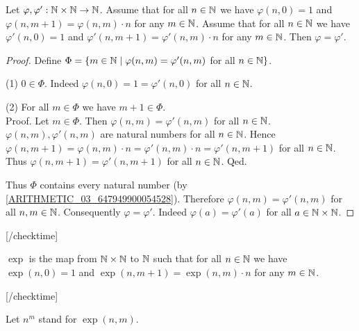 \documentclass[10pt]{article}
\begin{document}
  \begin{forthel}
    [checktime 3]
    \begin{lemma}
      Let $\varphi, \varphi' : \mathbb{N} \times \mathbb{N} \to \mathbb{N}$.
      Assume that for all $n \in \mathbb{N}$ we have $\varphi(n, 0) = 1$ and
      $\varphi(n, m + 1) = \varphi(n,m) \cdot n$ for any $m \in \mathbb{N}$.
      Assume that for all $n \in \mathbb{N}$ we have $\varphi'(n, 0) = 1$ and
      $\varphi'(n, m + 1) = \varphi'(n,m) \cdot n$ for any $m \in \mathbb{N}$.
      Then $\varphi = \varphi'$.
    \end{lemma}
    \begin{proof}
      Define $\Phi = \{ m \in \mathbb{N} \mid \varphi(n,m) = \varphi'(n,m)$ for
      all $n \in \mathbb{N} \}$.

      (1) $0 \in \Phi$.
      Indeed $\varphi(n,0) = 1 = \varphi'(n,0)$ for all $n \in \mathbb{N}$.

      (2) For all $m \in \Phi$ we have $m + 1 \in \Phi$. \\
      Proof.
        Let $m \in \Phi$.
        Then $\varphi(n,m) = \varphi'(n,m)$ for all $n \in \mathbb{N}$.
        $\varphi(n,m), \varphi'(n,m)$ are natural numbers for all $n \in \mathbb{N}$. %
        Hence $\varphi(n, m + 1)
          = \varphi(n,m) \cdot n
          = \varphi'(n,m) \cdot n
          = \varphi'(n, m + 1)$
        for all $n \in \mathbb{N}$.
        Thus $\varphi(n,m + 1) = \varphi'(n,m + 1)$ for all $n \in \mathbb{N}$.
      Qed.

      Thus $\Phi$ contains every natural number (by \cref{ARITHMETIC_03_647949900054528}).
      Therefore $\varphi(n,m) = \varphi'(n,m)$ for all $n, m \in \mathbb{N}$.
      Consequently $\varphi = \varphi'$.
      Indeed $\varphi(a) = \varphi'(a)$ for all $a \in \mathbb{N} \times \mathbb{N}$.
    \end{proof}
    [/checktime]
  \end{forthel}

  \begin{forthel}
    [checktime 3]
    \begin{definition}
      $\exp$ is the map from $\mathbb{N} \times \mathbb{N}$ to $\mathbb{N}$ such that for all
      $n \in \mathbb{N}$ we have $\exp(n, 0) = 1$ and $\exp(n, m + 1) =
      \exp(n, m) \cdot n$ for any $m \in \mathbb{N}$.
    \end{definition}
    [/checktime]

    Let $n^{m}$ stand for $\exp(n,m)$.
  \end{forthel}
\end{document}
